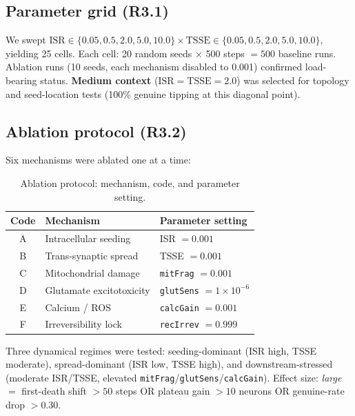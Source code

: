 \documentclass[12pt,a4paper]{article}
\begin{document}
\subsection{Parameter grid (R3.1)}

We swept $\mathrm{ISR} \in \{0.05, 0.5, 2.0, 5.0, 10.0\} \times \mathrm{TSSE} \in
\{0.05, 0.5, 2.0, 5.0, 10.0\}$, yielding 25 cells. Each cell: 20 random seeds $\times$
500 steps $= 500$ baseline runs. Ablation runs (10 seeds, each mechanism disabled to 0.001)
confirmed load-bearing status. \textbf{Medium context} ($\mathrm{ISR} = \mathrm{TSSE} = 2.0$)
was selected for topology and seed-location tests (100\% genuine tipping at this diagonal point).

\subsection{Ablation protocol (R3.2)}
\label{sec:ablation}

Six mechanisms were ablated one at a time:

\begin{table}[H]
\centering
\caption{Ablation protocol: mechanism, code, and parameter setting.}
\label{tab:ablation}
\begin{tabular}{clp{6.5cm}}
\toprule
\textbf{Code} & \textbf{Mechanism} & \textbf{Parameter setting} \\
\midrule
A & Intracellular seeding     & ISR $= 0.001$                          \\
B & Trans-synaptic spread     & TSSE $= 0.001$                         \\
C & Mitochondrial damage      & \texttt{mitFrag} $= 0.001$             \\
D & Glutamate excitotoxicity  & \texttt{glutSens} $= 1\times 10^{-6}$  \\
E & Calcium / ROS             & \texttt{calcGain} $= 0.001$            \\
F & Irreversibility lock      & \texttt{recIrrev} $= 0.999$            \\
\bottomrule
\end{tabular}
\end{table}

Three dynamical regimes were tested: seeding-dominant (ISR high, TSSE moderate),
spread-dominant (ISR low, TSSE high), and downstream-stressed (moderate ISR/TSSE, elevated
\texttt{mitFrag}/\texttt{glutSens}/\texttt{calcGain}). Effect size: \textit{large} $=$ first-death shift
$> 50$ steps OR plateau gain $> 10$ neurons OR genuine-rate drop $> 0.30$.
\end{document}
